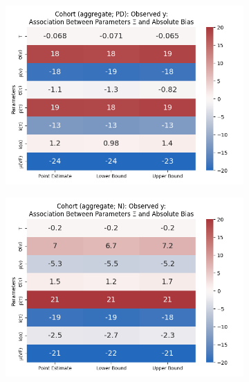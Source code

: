 \documentclass[12pt]{article}
\begin{document}
\begin{figure}[H]
\begin{subfigure}[t]{0.23\linewidth}
		\includegraphics[scale=0.25]{VEMethod_Drivers1b_FEest_Li_MSpec_Heatmap7.png}
	\end{subfigure}
	\begin{subfigure}[t]{0.23\linewidth}
		\centering
		\caption{}
		\includegraphics[scale=0.25]{VEMethod_Drivers1b_FEest_Li_MSpec_Heatmap8.png}
	\end{subfigure}


\end{figure}
\end{document}
